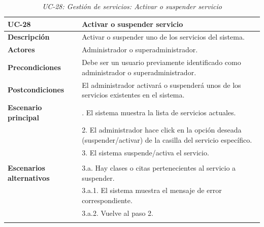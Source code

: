 \begin{table}[H]
  \begin{center}
    \begin{tabularx}{16.4cm}{|l|X|}
      \hline
      \textbf{UC-28} & \textbf{Activar o suspender servicio}\\
      \hline
      \textbf{Descripción} & Activar o suspender uno de los servicios del sistema.\\
      \hline
      \textbf{Actores} & Administrador o superadministrador.\\
      \hline
      \textbf{Precondiciones} & Debe ser un usuario previamente identificado como administrador o superadministrador.\\
      \hline
      \textbf{Postcondiciones} & El administrador activará o suspenderá unos de los servicios existentes en el sistema.\\
      \hline
      \textbf{Escenario principal} & \smallskip 1. El sistema muestra la lista de servicios actuales.\\
      & 2. El administrador hace click en la opción deseada (suspender/activar) de la casilla del servicio específico.\\
      & 3. El sistema suspende/activa el servicio.\\
      & \\
      \hline
      \textbf{Escenarios alternativos} & \smallskip 3.a. Hay clases o citas pertenecientes al servicio a suspender.\\
      & \hspace{0.3cm} 3.a.1. El sistema muestra el mensaje de error correspondiente.\\
      & \hspace{0.3cm} 3.a.2. Vuelve al paso 2.\\      
      & \\
      \hline
    \end{tabularx}
    \caption{\textit{UC-28: Gestión de servicios: Activar o suspender servicio}}
    \label{tab:CU-activar-suspender-servicio}
  \end{center}
\end{table}



